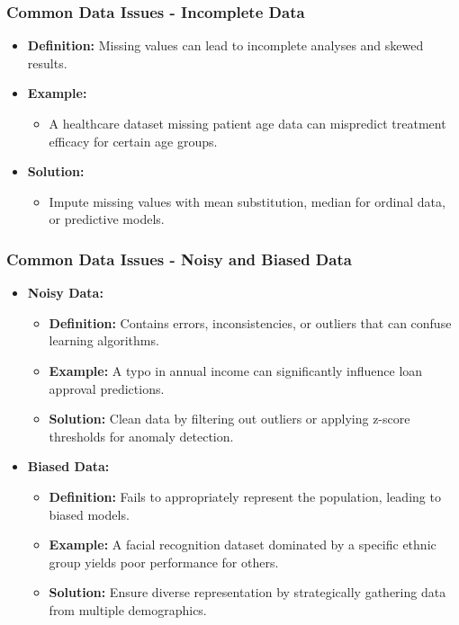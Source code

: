 \documentclass[aspectratio=169]{beamer}
\begin{document}
\begin{frame}[fragile]
    \frametitle{Common Data Issues - Incomplete Data}
    \begin{itemize}
        \item \textbf{Definition:} Missing values can lead to incomplete analyses and skewed results.
        \item \textbf{Example:} 
            \begin{itemize}
                \item A healthcare dataset missing patient age data can mispredict treatment efficacy for certain age groups.
            \end{itemize}
        \item \textbf{Solution:} 
            \begin{itemize}
                \item Impute missing values with mean substitution, median for ordinal data, or predictive models.
            \end{itemize}
    \end{itemize}
\end{frame}

\begin{frame}[fragile]
    \frametitle{Common Data Issues - Noisy and Biased Data}
    \begin{itemize}
        \item \textbf{Noisy Data:}
            \begin{itemize}
                \item \textbf{Definition:} Contains errors, inconsistencies, or outliers that can confuse learning algorithms.
                \item \textbf{Example:} A typo in annual income can significantly influence loan approval predictions.
                \item \textbf{Solution:} Clean data by filtering out outliers or applying z-score thresholds for anomaly detection.
            \end{itemize}
        \item \textbf{Biased Data:}
            \begin{itemize}
                \item \textbf{Definition:} Fails to appropriately represent the population, leading to biased models.
                \item \textbf{Example:} A facial recognition dataset dominated by a specific ethnic group yields poor performance for others.
                \item \textbf{Solution:} Ensure diverse representation by strategically gathering data from multiple demographics.
            \end{itemize}
    \end{itemize}
\end{frame}
\end{document}
